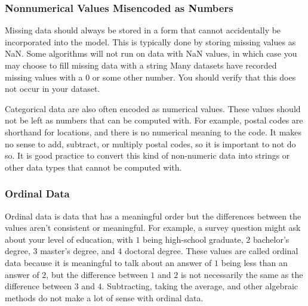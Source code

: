 \subsubsection*{Nonnumerical Values Misencoded as Numbers}
Missing data should always be stored in a form that cannot accidentally be incorporated into the model. 
This is typically done by storing missing values as NaN. 
Some algorithms will not run on data with NaN values, in which case you may choose to fill missing data with a string 
Many datasets have recorded missing values with a $0$ or some other number. You should verify that this does not occur in your dataset.


Categorical data are also often encoded as numerical values. 
These values should not be left as numbers that can be computed with. 
For example, postal codes are shorthand for locations, and there is no numerical meaning to the code. 
It makes no sense to add, subtract, or multiply postal codes, so it is important to not do so. 
It is good practice to convert this kind of non-numeric data into strings or other data types that cannot be computed with. 


\subsubsection*{Ordinal Data}

Ordinal data is data that has a meaningful order but the differences between the values aren’t consistent or meaningful. 
For example, a survey question might ask about your level of education, with $1$ being high-school graduate, $2$ bachelor’s degree, $3$ master’s degree, and $4$ doctoral degree. 
These values are called ordinal data because it is meaningful to talk about an answer of $1$ being less than an answer of $2$, but the difference between $1$ and $2$ is not necessarily the same as the difference between $3$ and $4$. 
Subtracting, taking the average, and other algebraic methods do not make a lot of sense with ordinal data. 


